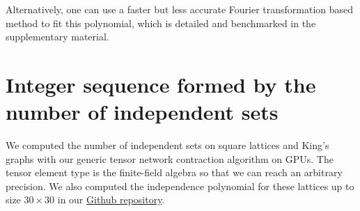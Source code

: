 \documentclass[onefignum, onetabnum]{siamart190516}
\newcommand{\<}{\langle}
\renewcommand{\>}{\rangle}
\begin{document}
Alternatively, one can use a faster but less accurate Fourier transformation based method to fit this polynomial, which is detailed and benchmarked in the supplementary material.

\section{Integer sequence formed by the number of independent sets}

We computed the number of independent sets on square lattices and King's graphs with our generic tensor network contraction algorithm on GPUs.
The tensor element type is the finite-field algebra so that we can reach an arbitrary precision.
We also computed the independence polynomial for these lattices up to size $30\times 30$ in our \href{https://github.com/GiggleLiu/NoteOnTropicalMIS/tree/master/data}{Github repository}.


\begin{table}[h]
\caption{The number of independent sets for square lattice graphs of size $L\times L$. This forms the integer sequence \href{https://oeis.org/A006506}{OEIS A006506}.
Here we only include two updated entries for $L=38,39$, which, to our knowledge, has not been computed before~\cite{Butera2014}.
}
\begin{center}
\end{center}
\label{tbl:squaregrid}
\end{table}
\end{document}
